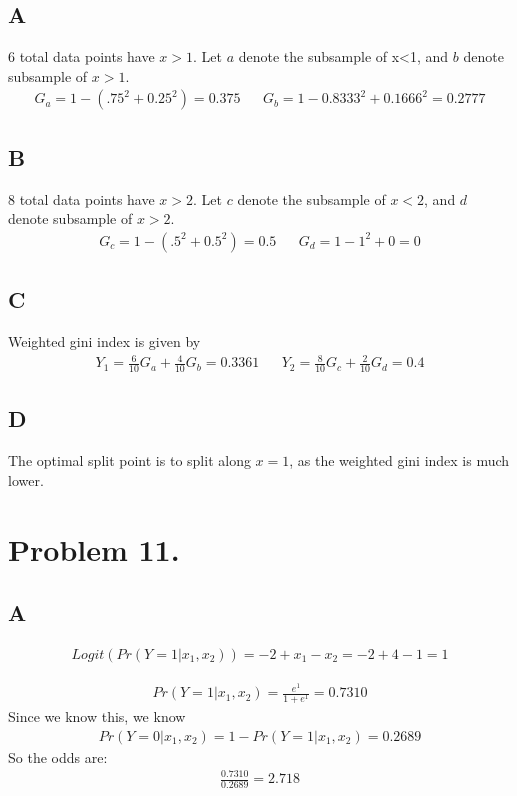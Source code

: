 \documentclass{article}
\begin{document}
\subsection*{A}
6 total data points have $x>1$. Let $a$ denote the subsample of x<1, and $b$ denote subsample of $x>1$.
\begin{align*}
G_a = 1-(.75^2+0.25^2) = 0.375 && G_b = 1-{0.8333^2 + 0.1666^2} = 0.2777
\end{align*}
\subsection*{B}
8 total data points have $x>2$. Let $c$ denote the subsample of $x<2$, and $d$ denote subsample of $x>2$.
\begin{align*}
G_c = 1-(.5^2+0.5^2) = 0.5 && G_d = 1-{1^2 + 0} = 0
\end{align*}
\subsection*{C}
Weighted gini index is given by
\begin{align*}
Y_1 = \frac{6}{10} G_a + \frac{4}{10} G_b = 0.3361 && Y_2 = \frac{8}{10} G_c + \frac{2}{10} G_d = 0.4
\end{align*}
\subsection*{D}
The optimal split point is to split along $x=1$, as the weighted gini index is much lower.
\clearpage
\section*{Problem 11.}
\subsection*{A}
\begin{align*}
Logit(Pr(Y=1|x_1,x_2)) = -2 + x_1 - x_2 = -2 + 4 -1 = 1
\end{align*}

\begin{align*}
Pr(Y=1|x_1,x_2) = \frac{e^1}{1+e^1} = 0.7310
\end{align*}
Since we know this, we know
\begin{align*}
Pr(Y=0|x_1,x_2) = 1-Pr(Y=1|x_1,x_2) = 0.2689
\end{align*}
So the odds are:
\begin{align*}
\boxed{ \frac{0.7310}{0.2689} = 2.718 }
\end{align*}
\end{document}
